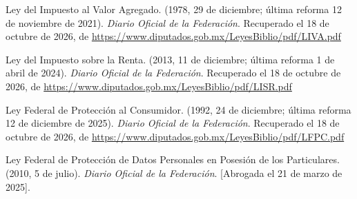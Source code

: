 \documentclass[12pt, a4paper]{article}
\begin{document}
\begin{list}{}{\setlength{\leftmargin}{1.27cm}\setlength{\itemindent}{-1.27cm}%
  \setlength{\labelwidth}{0pt}\setlength{\labelsep}{0pt}\setlength{\itemsep}{6pt}}


\item Ley del Impuesto al Valor Agregado. (1978, 29 de diciembre;
  última reforma 12 de noviembre de 2021). \textit{Diario Oficial de la Federación}. Recuperado el 18 de octubre de 2026, de \url{https://www.diputados.gob.mx/LeyesBiblio/pdf/LIVA.pdf}
 
 
\item Ley del Impuesto sobre la Renta. (2013, 11 de diciembre;
  última reforma 1 de abril de 2024). \textit{Diario Oficial de la Federación}.
Recuperado el 18 de octubre de 2026, de \url{https://www.diputados.gob.mx/LeyesBiblio/pdf/LISR.pdf}
 
 
\item Ley Federal de Protección al Consumidor. (1992, 24 de diciembre;
  última reforma 12 de diciembre de 2025). \textit{Diario Oficial de la Federación}.
Recuperado el 18 de octubre de 2026, de \url{https://www.diputados.gob.mx/LeyesBiblio/pdf/LFPC.pdf}
 

\item Ley Federal de Protección de Datos Personales en Posesión
  de los Particulares. (2010, 5 de julio). \textit{Diario Oficial
  de la Federación}. [Abrogada el 21 de marzo de 2025].



\end{list}
\end{document}
